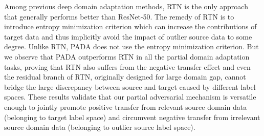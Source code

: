 \documentclass[runningheads]{llncs}
\begin{document}
\begin{table}[tbp]
    \centering 
    \caption{Classification accuracy on \emph{ImageNet-Caltech} and \emph{VisDA2017} (ResNet-50)}
    \label{table:accuracy_visda}
\end{table}

Among previous deep domain adaptation methods, RTN is the only approach that generally performs better than ResNet-50. The remedy of RTN is to introduce entropy minimization criterion which can increase the contributions of target data and thus implicitly avoid the impact of outlier source data to some degree. Unlike RTN, PADA does not use the entropy minimization criterion. But we observe that PADA outperforms RTN in all the partial domain adaptation tasks, proving that RTN also suffers from the negative transfer effect and even the residual branch of RTN, originally designed for large domain gap, cannot bridge the large discrepancy between source and target caused by different label spaces. These results validate that our partial adversarial mechanism is versatile enough to jointly promote positive transfer from relevant source domain data (belonging to target label space) and circumvent negative transfer from irrelevant source domain data (belonging to outlier source label space).
\end{document}
